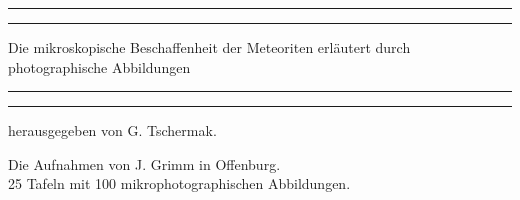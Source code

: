 \documentclass[a4paper, 11pt, oneside, polutonikogreek, german]{article}
\begin{document}
\begin{titlepage} %
	\centering %
	\scshape %

	
	\rule{\textwidth}{1.6pt}\vspace*{-\baselineskip}\vspace*{2pt} %
	\rule{\textwidth}{0.4pt} %
	
	\vspace{0.75\baselineskip} %

        {\LARGE Die mikroskopische Beschaffenheit der Meteoriten erläutert durch photographische Abbildungen} %
	
	\vspace{0.75\baselineskip} %
	
	\rule{\textwidth}{0.4pt}\vspace*{-\baselineskip}\vspace{3.2pt} %
	\rule{\textwidth}{1.6pt} %
	
	\vspace{1\baselineskip} %
	
	
	{herausgegeben von G. Tschermak.} %
	
	\vspace*{1\baselineskip} %
	

 	{\small Die Aufnahmen von J. Grimm in Offenburg.\\ 25 Tafeln mit 100 mikrophotographischen Abbildungen.} %

	\vspace{1\baselineskip} %

	
	

\end{titlepage}
\end{document}
